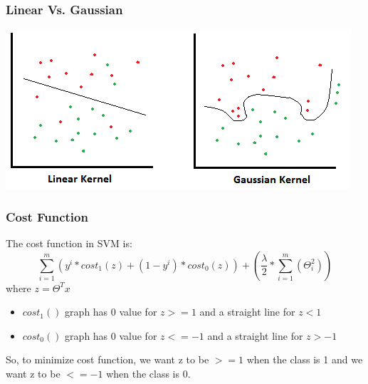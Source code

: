 \documentclass[11pt,xcolor=dvipsnames]{beamer}
\begin{document}
\begin{frame}
\frametitle{Linear Vs. Gaussian}
\centering
\includegraphics[scale=0.72]{linear_gaussian.png}
\end{frame}


\begin{frame}
\frametitle{Cost Function}
The cost function in SVM is:
\begin{displaymath}
\sum_{i=1}^{m}(y^i * cost_{1}(z)  +  (1-y^i) * cost_{0}(z)) + (\frac{\lambda}{2} * \sum_{i=1}^{m}(\Theta_{i}^2))
\end{displaymath}
\smallskip
where $z = \Theta^T x$
\smallskip
\begin{itemize}
\item $cost_1()$ graph has 0 value for $z>=1$ and a straight line for $z<1$\\
\item $cost_0()$ graph has 0 value for $z<=-1$ and a straight line for $z>-1$\\
\end{itemize}
\medskip
So, to minimize cost function, we want z to be $>=1$ when the class is 1 and we want z to be $<=-1$ when the class is 0.
\end{frame}
\end{document}
